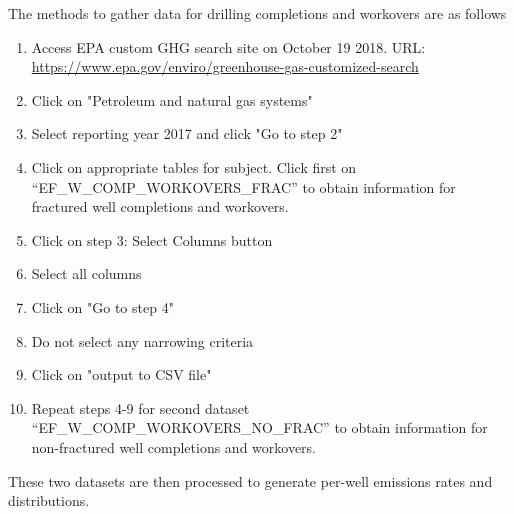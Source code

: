 \documentclass[11pt]{report}
\begin{document}
The methods to gather data for drilling completions and workovers are as follows

\begin{enumerate}
\item Access EPA custom GHG search site on October 19 2018. URL: \url{https://www.epa.gov/enviro/greenhouse-gas-customized-search}
\item Click on "Petroleum and natural gas systems"
\item Select reporting year 2017 and click "Go to step 2"
\item Click on appropriate tables for subject. Click first on \\ ``EF\_W\_COMP\_WORKOVERS\_FRAC'' to obtain information for fractured well completions and workovers.
\item Click on step 3: Select Columns button
\item Select all columns
\item Click on "Go to step 4"
\item Do not select any narrowing criteria
\item Click on "output to CSV file"
\item Repeat steps 4-9 for second dataset ``EF\_W\_COMP\_WORKOVERS\_NO\_FRAC'' to obtain information for non-fractured well completions and workovers.
\end{enumerate}

These two datasets are then processed to generate per-well emissions rates and distributions.
\end{document}
